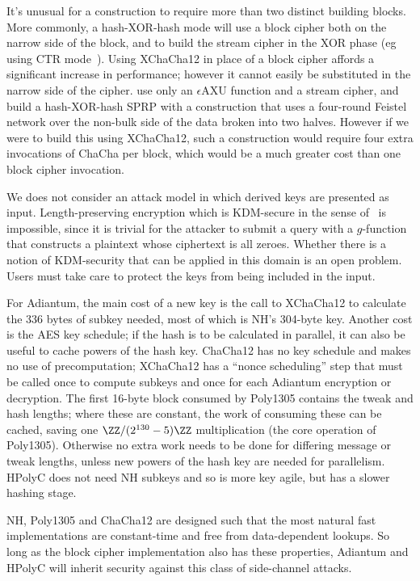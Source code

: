 \documentclass[journal=tosc,preprint,floatrow,submission]{iacrtrans}
\begin{document}
It's unusual for a construction to require more than two distinct building blocks.
More commonly, a hash-XOR-hash mode will use a block cipher both on the narrow side of the
block, and to build the stream cipher in the XOR phase (eg using CTR mode~\cite{ctr}).
Using XChaCha12 in place of a block cipher affords a significant increase in performance;
however it cannot easily be substituted in the narrow side of the cipher.
\cite{sarkar1,sarkar2,sarkar3,sarkar4} use only an $\epsilon$AXU function
and a stream cipher, and build a hash-XOR-hash SPRP
with a construction that uses a four-round Feistel network over the non-bulk side of the data
broken into two halves. However if we were to build this using XChaCha12,
such a construction would require four extra invocations of ChaCha per block, which would be
a much greater cost than one block cipher invocation.

We does not consider an attack model in which derived keys are presented as input.
Length-preserving encryption
which is KDM-secure in the sense of~\cite{kdm} is impossible, since it is trivial for the
attacker to submit a query with a $g$-function
that constructs a plaintext whose ciphertext is all zeroes.
Whether there is a notion of KDM-security that can be
applied in this domain is an open problem. Users must take care to protect the keys from being
included in the input.

For Adiantum, the
main cost of a new key is the call to XChaCha12 to calculate the 336 bytes of subkey needed,
most of which is NH's 304-byte key.
Another cost is the AES key schedule;
if the hash is to be calculated in parallel, it can also
be useful to cache powers of the hash key.
ChaCha12 has no key schedule and makes no use of
precomputation; XChaCha12 has a ``nonce scheduling'' step that
must be called once to compute subkeys and once for each Adiantum encryption or decryption.
The first 16-byte block consumed by Poly1305 contains the tweak and hash lengths; where
these are constant, the work of consuming these can be cached,
saving one $\ZZ/(2^{130}-5)\ZZ$ multiplication (the core operation of Poly1305).
Otherwise no extra work needs to be done for differing message or tweak lengths, unless
new powers of the hash key are needed for parallelism. HPolyC does not need NH subkeys and
so is more key agile, but has a slower hashing stage.

NH, Poly1305 and ChaCha12 are designed such that the most natural fast implementations are
constant-time and free from data-dependent lookups. So long as the block cipher implementation
also has these properties, Adiantum and HPolyC will inherit security against
this class of side-channel attacks.
\end{document}
